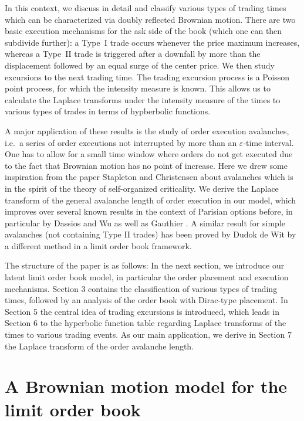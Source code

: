 \documentclass[11pt]{scrartcl}
\begin{document}
In this context, we discuss in detail and classify various types of trading
times which can be characterized via doubly reflected Brownian motion. {There
are two basic execution mechanisms for the ask side of the book (which one can
then subdivide further): a Type~{I} trade occurs whenever the price maximum
increases, whereas a Type~{II} trade is triggered after a downfall by more
than the displacement followed by an equal surge of the center price. }We then
study excursions to the next trading time. The trading excursion process is a
Poisson point process, for which the intensity measure is known. This allows
us to calculate the Laplace transforms under the intensity measure of the
times to various types of trades in terms of hypberbolic functions.

A major application of these results is the study of order execution
avalanches, {i.e.\ a series of order executions not interrupted by more than
an $\varepsilon$-time interval.} One has to allow for a small time window
where orders do not get executed due to the fact that Brownian motion has no
point of increase. Here we drew some inspiration from the paper Stapleton and
Christensen \cite{SC} about avalanches which is in the spirit of the theory of
self-organized criticality. We derive the Laplace transform of the general
avalanche length of order execution in our model, which improves over several
known results in the context of Parisian options before, in particular by
Dassios and Wu \cite{DW} as well as Gauthier \cite{G}. A similar result for
simple avalanches (not containing Type II trades) has been proved by Dudok de
Wit \cite{DDW} by a different method in a limit order book framework. 

The structure of the paper is as follows: In the next section, we introduce
our latent limit order book model, in particular the order placement and
execution mechanisms. Section 3 contains the classification of various types
of trading times, followed by an analysis of the order book with Dirac-type
placement. In Section 5 the central idea of trading excursions is introduced,
which leads in Section 6 to the hyperbolic function table regarding Laplace transforms
of the times to various trading events. As our main application, we derive in
Section 7 the Laplace transform of the order avalanche length.

\section{A Brownian motion model for the limit order book}
\end{document}

